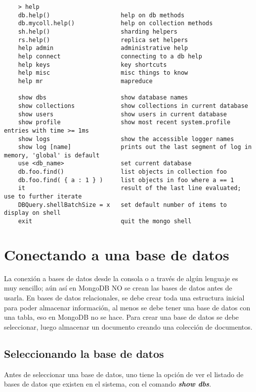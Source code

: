 \begin{lstlisting}
    > help
	db.help()                    help on db methods
	db.mycoll.help()             help on collection methods
	sh.help()                    sharding helpers
	rs.help()                    replica set helpers
	help admin                   administrative help
	help connect                 connecting to a db help
	help keys                    key shortcuts
	help misc                    misc things to know
	help mr                      mapreduce

	show dbs                     show database names
	show collections             show collections in current database
	show users                   show users in current database
	show profile                 show most recent system.profile entries with time >= 1ms
	show logs                    show the accessible logger names
	show log [name]              prints out the last segment of log in memory, 'global' is default
	use <db_name>                set current database
	db.foo.find()                list objects in collection foo
	db.foo.find( { a : 1 } )     list objects in foo where a == 1
	it                           result of the last line evaluated; use to further iterate
	DBQuery.shellBatchSize = x   set default number of items to display on shell
	exit                         quit the mongo shell
\end{lstlisting}

\section{Conectando a una base de datos}

La conexi\'on a bases de datos desde la consola o a trav\'es de alg\'un lenguaje es muy sencillo; a\'un as\'i en MongoDB NO se crean las bases de datos antes de usarla. En bases de datos relacionales, se debe crear toda una estructura inicial para poder almacenar informaci\'on, al menos se debe tener una base de datos con una tabla, eso en MongoDB no se hace. Para crear una base de datos se debe seleccionar, luego almacenar un documento creando una colecci\'on de documentos.

\subsection{Seleccionando la base de datos}

Antes de seleccionar una base de datos, uno tiene la opci\'on de ver el listado de bases de datos que existen en el sistema, con el comando \textit{\textbf{show dbs}}.


